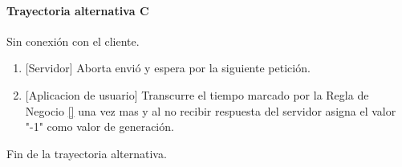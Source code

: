 \paragraph{Trayectoria alternativa C} \label{SUB-M-CU5:TC}
	Sin conexión con el cliente.
	\begin{enumerate}[label=C\arabic*.]
		\item {[Servidor]} Aborta envió y espera por la siguiente petición.
		\item {[Aplicacion de usuario]} Transcurre el tiempo marcado por la Regla de Negocio \ref{} una vez mas y al no recibir respuesta del servidor asigna el valor "-1" como valor de generación.
	\end{enumerate}
	Fin de la trayectoria alternativa.